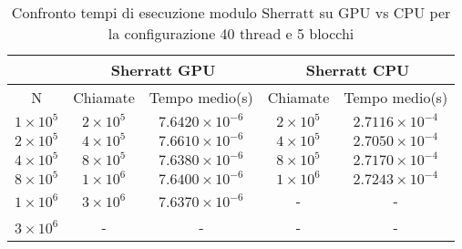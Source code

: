\begin{table}[ht!]
    \begin{center}
        \renewcommand{\arraystretch}{1.5}
        \begin{adjustbox}{width=.65\textwidth}
            \begin{tabular}{ |c|c|c|c|c| }
                \hline
                \multicolumn{1}{|c}{} & \multicolumn{2}{|c}{Sherratt GPU} & \multicolumn{2}{|c|}{Sherratt CPU} \\
                \hline
                N & Chiamate & Tempo medio(s) & Chiamate & Tempo medio(s) \\
                \hline 
                $1 \times 10^5$ & $2 \times 10^{5}$ & $7.6420 \times 10^{-6}$  & $2 \times 10^{5}$ & $2.7116 \times 10^{-4}$ \\ 
                \hline 
                $2 \times 10^5$ & $4 \times 10^{5}$ & $7.6610 \times 10^{-6}$  & $4 \times 10^{5}$ & $2.7050 \times 10^{-4}$ \\ 
                \hline 
                $4 \times 10^5$ & $8 \times 10^{5}$ & $7.6380 \times 10^{-6}$  & $8 \times 10^{5}$ & $2.7170 \times 10^{-4}$ \\ 
                \hline
                $8 \times 10^5$ & $1 \times 10^{6}$ & $7.6400 \times 10^{-6}$  & $1 \times 10^{6}$ & $2.7243 \times 10^{-4}$ \\ 
                \hline 
                $1 \times 10^6$ & $3 \times 10^{6}$ & $7.6370 \times 10^{-6}$  & - & - \\ 
                \hline 
                $3 \times 10^6$ & - & - & - & - \\ 
                \hline 
            \end{tabular}
        \end{adjustbox}
    \end{center}
    \caption{Confronto tempi di esecuzione modulo Sherratt su GPU vs CPU per la configurazione 40 thread e 5 blocchi}
    \label{tab:sherratt_kernel_table_40x5}
\end{table}

